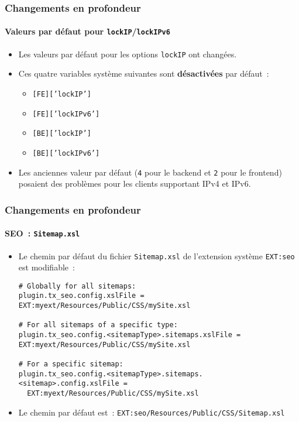 \begin{frame}[fragile]
	\frametitle{Changements en profondeur}
	\framesubtitle{Valeurs par défaut pour \texttt{lockIP}/\texttt{lockIPv6}}

	\lstset{basicstyle=\smaller\ttfamily}

	\begin{itemize}
		\item Les valeurs par défaut pour les options \texttt{lockIP} ont changées.
		\item Ces quatre variables système suivantes sont \textbf{désactivées} par défaut~:

			\begin{itemize}
				\item \texttt{[FE]['lockIP']}
				\item \texttt{[FE]['lockIPv6']}
				\item \texttt{[BE]['lockIP']}
				\item \texttt{[BE]['lockIPv6']}
			\end{itemize}

		\item Les anciennes valeur par défaut (\texttt{4} pour le backend et \texttt{2} pour le frontend)
			posaient des problèmes pour les clients supportant IPv4 et IPv6.

	\end{itemize}

\end{frame}


\begin{frame}[fragile]
	\frametitle{Changements en profondeur}
	\framesubtitle{SEO~: \texttt{Sitemap.xsl}}

	\lstset{basicstyle=\tiny\ttfamily}

	\begin{itemize}
		\item Le chemin par défaut du fichier \texttt{Sitemap.xsl} de l'extension
			système \texttt{EXT:seo} est modifiable~:
\begin{lstlisting}
# Globally for all sitemaps:
plugin.tx_seo.config.xslFile = EXT:myext/Resources/Public/CSS/mySite.xsl

# For all sitemaps of a specific type:
plugin.tx_seo.config.<sitemapType>.sitemaps.xslFile = EXT:myext/Resources/Public/CSS/mySite.xsl

# For a specific sitemap:
plugin.tx_seo.config.<sitemapType>.sitemaps.<sitemap>.config.xslFile =
  EXT:myext/Resources/Public/CSS/mySite.xsl
\end{lstlisting}

		\item Le chemin par défaut est~:\newline
			\smaller
				\texttt{EXT:seo/Resources/Public/CSS/Sitemap.xsl}
			\normalsize

	\end{itemize}

\end{frame}

